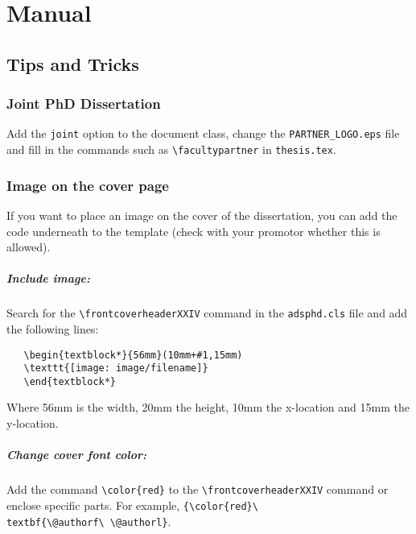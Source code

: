 \chapter{Manual}\label{ch:manual}


\section{Tips and Tricks}

\subsection{Joint PhD Dissertation}

Add the \texttt{joint} option to the document class, change the 
\texttt{PARTNER\_LOGO.eps} file and fill in the commands such as 
\texttt{\textbackslash facultypartner} in \texttt{thesis.tex}.

\subsection{Image on the cover page}

If you want to place an image on the cover of the dissertation, you can add
the code underneath to the template (check with your promotor whether this is
allowed).

\paragraph{Include image:}
Search for the \texttt{\textbackslash frontcoverheaderXXIV} command in
the \texttt{adsphd.cls} file and add the following lines:
\begin{verbatim}
   \begin{textblock*}{56mm}(10mm+#1,15mm)
   \texttt{[image: image/filename]}
   \end{textblock*}
\end{verbatim}
Where 56mm is the width, 20mm the height, 10mm the x-location and 15mm the
y-location.

\paragraph{Change cover font color:}
Add the command \texttt{\textbackslash color\{red\}} to the
\texttt{\textbackslash frontcoverheaderXXIV} command or enclose specific parts.
For example, \texttt{\{\textbackslash color\{red\}\textbackslash
textbf\{\textbackslash @authorf\textbackslash\ \textbackslash @authorl\}}.


